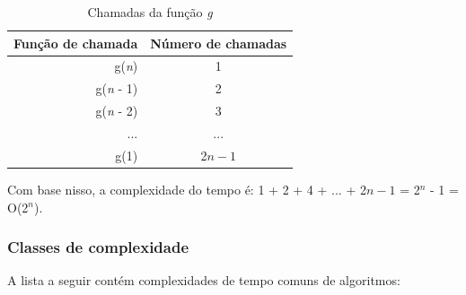 \begin{table}[h!]
   \begin{center}
        \begin{tabular}{rc}
            \textbf{Função de chamada} & \textbf{Número de chamadas}\\ 
            \hline
            g(\textit{n})                       & 1                          \\
            g(\textit{n} - 1)                   & 2                          \\
            g(\textit{n} - 2)                   & 3                            \\
            ...                        & ...                           \\
            g(1)                       &2$n-1$              \\
            \hline
        \end{tabular}
         \caption{Chamadas da função \textit{g}}
         \label{tab:g}
    \end{center}
\end{table}

Com base nisso, a complexidade do tempo é:
1 + 2 + 4 + ... + 2$n-1$ = 2$^n$ - 1 = O(2$^n$).

\subsubsection{Classes de complexidade}

A lista a seguir contém complexidades de tempo comuns de algoritmos:

